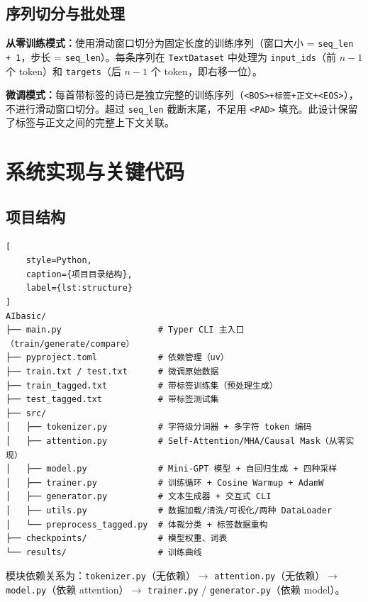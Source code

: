\documentclass[a4paper, 12pt, centering, AutoFakeBold]{article}
\begin{document}
\subsection{序列切分与批处理}

\textbf{从零训练模式：}使用滑动窗口切分为固定长度的训练序列（窗口大小 = \texttt{seq\_len + 1}，步长 = \texttt{seq\_len}）。每条序列在 \texttt{TextDataset} 中处理为 \texttt{input\_ids}（前 $n-1$ 个 token）和 \texttt{targets}（后 $n-1$ 个 token，即右移一位）。

\textbf{微调模式：}每首带标签的诗已是独立完整的训练序列（\texttt{<BOS>+标签+正文+<EOS>}），不进行滑动窗口切分。超过 \texttt{seq\_len} 截断末尾，不足用 \texttt{<PAD>} 填充。此设计保留了标签与正文之间的完整上下文关联。

\section{系统实现与关键代码}

\subsection{项目结构}

\begin{lstlisting}[
    style=Python,
    caption={项目目录结构},
    label={lst:structure}
]
AIbasic/
├── main.py                   # Typer CLI 主入口（train/generate/compare）
├── pyproject.toml            # 依赖管理（uv）
├── train.txt / test.txt      # 微调原始数据
├── train_tagged.txt          # 带标签训练集（预处理生成）
├── test_tagged.txt           # 带标签测试集
├── src/
│   ├── tokenizer.py          # 字符级分词器 + 多字符 token 编码
│   ├── attention.py          # Self-Attention/MHA/Causal Mask（从零实现）
│   ├── model.py              # Mini-GPT 模型 + 自回归生成 + 四种采样
│   ├── trainer.py            # 训练循环 + Cosine Warmup + AdamW
│   ├── generator.py          # 文本生成器 + 交互式 CLI
│   ├── utils.py              # 数据加载/清洗/可视化/两种 DataLoader
│   └── preprocess_tagged.py  # 体裁分类 + 标签数据重构
├── checkpoints/              # 模型权重、词表
└── results/                  # 训练曲线
\end{lstlisting}

模块依赖关系为：\texttt{tokenizer.py}（无依赖）$\to$ \texttt{attention.py}（无依赖）$\to$ \texttt{model.py}（依赖 attention）$\to$ \texttt{trainer.py} / \texttt{generator.py}（依赖 model）。
\end{document}

